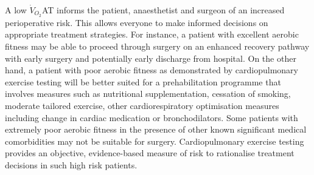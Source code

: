 A low $\dot{V}_{O_2}$AT informs the patient, anaesthetist and surgeon of an increased perioperative risk. 
This allows everyone to make informed decisions on appropriate treatment strategies. 
For instance, a patient with excellent aerobic fitness may be able to proceed through surgery on an enhanced recovery pathway with early surgery and potentially early discharge from hospital. 
On the other hand, a patient with poor aerobic fitness as demonstrated by cardiopulmonary exercise testing will be better suited for a prehabilitation programme that involves measures such as nutritional supplementation, cessation of smoking, moderate tailored exercise, other cardiorespiratory optimisation measures including change in cardiac medication or bronchodilators. 
Some patients with extremely poor aerobic fitness in the presence of other known significant medical comorbidities may not be suitable for surgery. 
Cardiopulmonary exercise testing provides an objective, evidence-based measure of risk to rationalise treatment decisions in such high risk patients.
